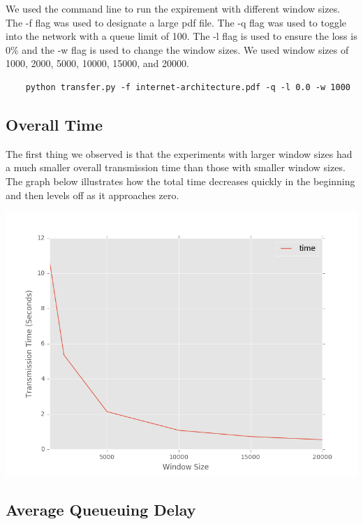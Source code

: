 \documentclass[11pt]{article}
\begin{document}
\vspace{5mm}

We used the command line to run the expirement with different window sizes. The -f flag was used to designate a large pdf file. The -q flag was used to toggle into the network with a queue limit of 100. The -l flag is used to ensure the loss is 0\% and the -w flag is used to change the window sizes. We used window sizes of 1000, 2000, 5000, 10000, 15000, and 20000.

\vspace{5mm}

\begin{lstlisting}
    python transfer.py -f internet-architecture.pdf -q -l 0.0 -w 1000
\end{lstlisting}

\clearpage
\subsection{Overall Time}

The first thing we observed is that the experiments with larger window sizes had a much smaller overall transmission time than those with smaller window sizes. The graph below illustrates how the total time decreases quickly in the beginning and then levels off as it approaches zero.

\vspace{5mm}

\includegraphics[width=17cm]{graphs/time-graph.png}

\clearpage
\subsection{Average Queueuing Delay}
\end{document}
